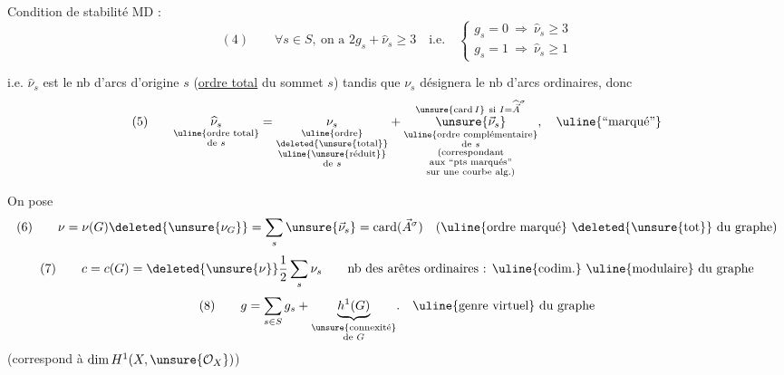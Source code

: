 
Condition de stabilité MD :
\[
(4)\qquad \forall s\in S,\ \text{on a }2g_s+\widehat\nu_s\geq3\quad\text{i.e.}\quad
\left\{\begin{array}{l}
g_s=0\ \Rightarrow\ \widehat\nu_s\geq3\\
g_s=1\ \Rightarrow\ \widehat\nu_s\geq1
\end{array}\right.
\]

i.e. $\widehat\nu_s$ est le nb d'arcs  d'origine $s$ (\uline{ordre total} du sommet $s$) tandis que $\nu_s$ désignera le nb d'arcs ordinaires, donc
\[
(5)\qquad
\underset{\substack{\uline{\text{ordre total}}\\\text{de }s}}{\widehat\nu_s}
=
\underset{\substack{\uline{\text{ordre}}\\\deleted{\unsure{\text{total}}}\\\uline{\unsure{\text{réduit}}}\\\text{de }s}}{\nu_s}
+
\overset{\substack{\unsure{\operatorname{card}I}\ \text{si }I=\widehat{\vec A}^{\sigma}}}{
\underset{\substack{\uline{\text{ordre complémentaire}}\\\text{de }s\\\text{(correspondant}\\\text{aux ``pts marqués''}\\\text{sur une courbe alg.)}}}{\unsure{\vec\nu_s}}}
,\quad \uline{\text{``marqué''}}
\]


On pose
\[
(6)\qquad \nu=\nu(G)\deleted{\unsure{\nu_G}}=\sum_s\unsure{\vec\nu_s}=\operatorname{card}(\vec A^{\sigma})\quad
(\uline{\text{ordre marqué}}\ \deleted{\unsure{\text{tot}}}\ \text{du graphe})
\]
\[
(7)\qquad c=c(G)=\deleted{\unsure{\nu}}\frac12\sum_s\nu_s
\qquad\text{nb des arêtes ordinaires : }\uline{\text{codim.}}\ \uline{\text{modulaire}}\ \text{du graphe}
\]
\[
(8)\qquad g=\sum_{s\in S}g_s+\underset{\substack{\unsure{\text{connexité}}\\\text{de }G}}{\underbrace{h^1(G)}}.
\quad\uline{\text{genre virtuel}}\ \text{du graphe}
\]
(correspond à $\dim H^1(X,\unsure{\mathcal O_X})$)

